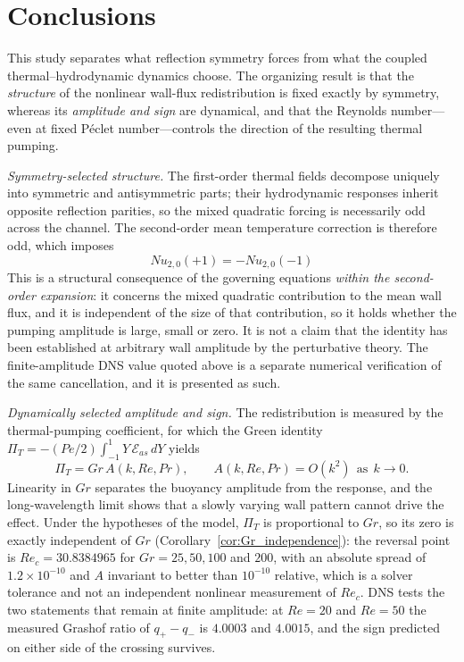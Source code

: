 \documentclass[12pt,a4paper]{article}
\newcommand{\Rey}{\mathit{Re}}
\newcommand{\Pe}{\mathit{Pe}}
\newcommand{\Grr}{\mathit{Gr}}
\newcommand{\Nu}{\mathit{Nu}}
\renewcommand{\Pr}{\mathit{Pr}}
\newcommand{\PiT}{\Pi_T}
\begin{document}
\section{Conclusions}

This study separates what reflection symmetry forces from what the coupled
thermal--hydrodynamic dynamics choose. The organizing result is that the
\emph{structure} of the nonlinear wall-flux redistribution is fixed exactly by
symmetry, whereas its \emph{amplitude and sign} are dynamical, and that the
Reynolds number---even at fixed P\'eclet number---controls the direction of the
resulting thermal pumping.

\emph{Symmetry-selected structure.} The first-order thermal fields decompose uniquely
into symmetric and antisymmetric parts; their hydrodynamic responses inherit
opposite reflection parities, so the mixed quadratic forcing is necessarily odd
across the channel. The second-order mean temperature correction is therefore
odd, which imposes
\begin{equation}
\Nu_{2,0}(+1) = -\Nu_{2,0}(-1)
\end{equation}
This is a structural consequence of the governing equations \emph{within the
second-order expansion}: it concerns the mixed quadratic contribution to the mean
wall flux, and it is independent of the size of that contribution, so it holds
whether the pumping amplitude is large, small or zero. It is not a claim that the
identity has been established at arbitrary wall amplitude by the perturbative
theory. The finite-amplitude DNS value quoted above is a separate numerical
verification of the same cancellation, and it is presented as such.

\emph{Dynamically selected amplitude and sign.} The redistribution is measured by the
thermal-pumping coefficient, for which the Green identity
$\PiT=-(\Pe/2)\int_{-1}^{1}Y\,\mathcal{E}_{as}\,dY$ yields
\begin{equation}
\PiT=\Grr\,A(k,\Rey,\Pr),
\qquad
A(k,\Rey,\Pr)=O(k^{2})\ \ \text{as}\ \ k\rightarrow0 .
\end{equation}
Linearity in $\Grr$ separates the buoyancy amplitude from the response, and the
long-wavelength limit shows that a slowly varying wall pattern cannot drive the
effect. Under the hypotheses of the model, $\PiT$ is proportional to $\Grr$, so its
zero is exactly independent of
$\Grr$ (Corollary~\ref{cor:Gr_independence}): the reversal point is
$\Rey_c=30.8384965$ for $\Grr=25,50,100$ and $200$, with an absolute spread of
$1.2\times10^{-10}$ and $A$ invariant to better than $10^{-10}$ relative, which is a
solver tolerance and not an independent nonlinear measurement of $\Rey_c$. DNS
tests the two statements that remain at finite amplitude: at $\Rey=20$ and $\Rey=50$ the measured
Grashof ratio of $q_+-q_-$ is $4.0003$ and $4.0015$, and the sign predicted on
either side of the crossing survives.
\end{document}
